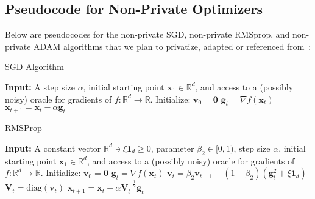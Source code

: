 \subsection{Pseudocode for Non-Private Optimizers}\label{subsec:pseudo-code-for-non-private-optimizers}
Below are pseudocodes for the non-private SGD, non-private RMSprop, and non-private ADAM algorithms that we plan to privatize, adapted or referenced from~\cite{DBLP:journals/corr/abs-1807-06766}:
\begin{algorithm}
    \caption{SGD Algorithm}
    \label{alg:sgd}
    \begin{algorithmic}[1]
        \State \textbf{Input:} A step size $\alpha$, initial starting point $\mathbf{x}_1 \in \mathbb{R}^d$,
        and access to a (possibly noisy) oracle for gradients of $f : \mathbb{R}^d \rightarrow \mathbb{R}$.
            \State Initialize: $\mathbf{v}_0 = \mathbf{0}$
                \State $\mathbf{g}_t = \nabla f(\mathbf{x}_t)$
                \State $\mathbf{x}_{t+1} = \mathbf{x}_t - \alpha \mathbf{g}_t$
            \EndFor
        \EndFunction
    \end{algorithmic}
\end{algorithm}
\vspace{-1cm}

\begin{algorithm}
    \caption{RMSProp}
    \label{alg:rmsprop}
    \begin{algorithmic}[1]
        \State \textbf{Input:} A constant vector $\mathbb{R}^d \ni \xi \mathbf{1}_d \geq 0$, parameter $\beta_2 \in [0, 1)$, step size $\alpha$, initial starting point $\mathbf{x}_1 \in \mathbb{R}^d$, and access to a (possibly noisy) oracle for gradients of $f : \mathbb{R}^d \rightarrow \mathbb{R}$.
            \State Initialize: $\mathbf{v}_0 = \mathbf{0}$
                \State $\mathbf{g}_t = \nabla f(\mathbf{x}_t)$
                \State $\mathbf{v}_t = \beta_2 \mathbf{v}_{t-1} + (1 - \beta_2)(\mathbf{g}_t^2 + \xi \mathbf{1}_d)$
                \State $\mathbf{V}_t = \text{diag}(\mathbf{v}_t)$
                \State $\mathbf{x}_{t+1} = \mathbf{x}_t - \alpha \mathbf{V}_t^{-\frac{1}{2}} \mathbf{g}_t$
            \EndFor
        \EndFunction
    \end{algorithmic}
\end{algorithm}
\vspace{-1cm}

